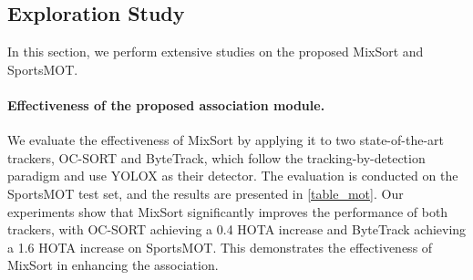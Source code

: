 \documentclass[10pt,twocolumn,letterpaper]{article}
\begin{document}
\subsection{Exploration Study}
\label{exploration_sec}
In this section, we perform extensive studies on the proposed MixSort and SportsMOT. 

\vspace{-4mm}
\paragraph{Effectiveness of the proposed association module.}
We evaluate the effectiveness of MixSort by applying it to two state-of-the-art trackers, OC-SORT\cite{cao2022observation} and ByteTrack\cite{zhang2022bytetrack}, which follow the tracking-by-detection paradigm and use YOLOX as their detector. The evaluation is conducted on the SportsMOT test set, and the results are presented in \cref{table_mot}. Our experiments show that MixSort significantly improves the performance of both trackers, with OC-SORT achieving a 0.4 HOTA increase and ByteTrack achieving a 1.6 HOTA increase on SportsMOT. This demonstrates the effectiveness of MixSort in enhancing the association.

\vspace{-4mm}
\end{document}
